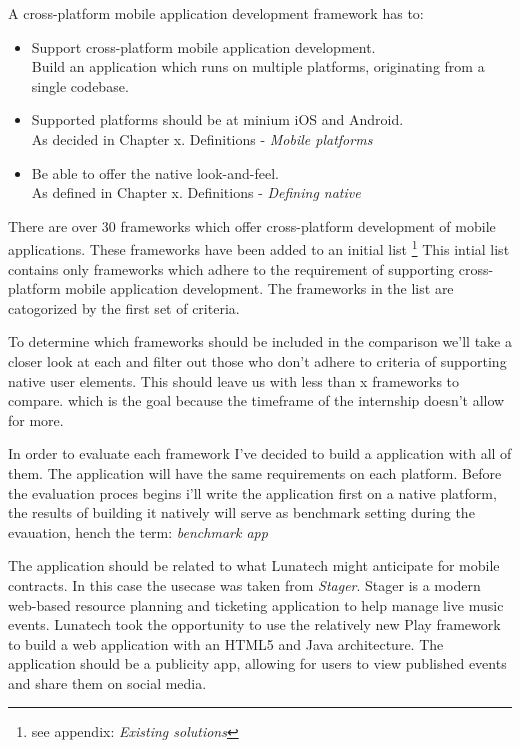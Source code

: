 A cross-platform mobile application development framework has to:
\begin{itemize}
\item Support cross-platform mobile application development.\\
Build an application which runs on multiple platforms, originating from a single codebase.
\item Supported platforms should be at minium iOS and Android.\\
As decided in Chapter x. Definitions - \emph{Mobile platforms}
\item Be able to offer the native look-and-feel.\\
As defined in Chapter x. Definitions - \emph{Defining native}
\end{itemize}



There are over 30 frameworks which offer cross-platform development of mobile applications\cite{Wikipedia2012}. These frameworks have been added to an initial list \footnote{see appendix: \emph{Existing solutions}} This intial list contains only frameworks which adhere to the requirement of supporting cross-platform mobile application development. The frameworks in the list are catogorized by the first set of criteria.

To determine which frameworks should be included in the comparison we'll take a closer look at each and filter out those who don't adhere to criteria of supporting native user elements. This should leave us with less than x frameworks to compare. which is the goal because the timeframe of the internship doesn't allow for more. 


In order to evaluate each framework I've decided to build a application with all of them. The application will have the same requirements on each platform. Before the evaluation proces begins i'll write the application first on a native platform, the results of building it natively will serve as benchmark setting during the evauation, hench the term: \emph{benchmark app}

The application should be related to what Lunatech might anticipate for mobile contracts. In this case the usecase was taken from \emph{Stager}. Stager is a modern web-based resource planning and ticketing application to help manage live music events. Lunatech took the opportunity to use the relatively new Play framework to build a web application with an HTML5 and Java architecture. The application should be a publicity app, allowing for users to view published events and share them on social media.

